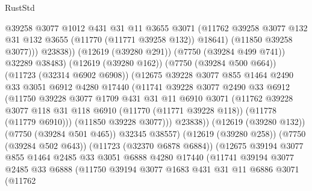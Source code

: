 \begin{lexlean}{RustStd}
\begin{coremodule}
                        @39258
                        @3077
                        @1012
                        @431
                        @31
                        @11
                        @3655
                        @3071
                        (@11762
                          @39258
                          @3077
                          @132
                          @31
                          @132
                          @3655
                          (@11770 (@11771 @39258 @132))
                          @18641)
                        (@11850 @39258 @3077)))
                    @23838))
                (@12619 (@39280 @291))
                (@7750 (@39284 @499 @741))
                @32289
                @38483)
              (@12619 (@39280 @162))
              (@7750 (@39284 @500 @664))
              (@11723 (@32314 @6902 @6908))
              (@12675
                @39228
                @3077
                @855
                @1464
                @2490
                @33
                @3051
                @6912
                @4280
                @17440
                (@11741
                  @39228
                  @3077
                  @2490
                  @33
                  @6912
                  (@11750
                    @39228
                    @3077
                    @1709
                    @431
                    @31
                    @11
                    @6910
                    @3071
                    (@11762
                      @39228
                      @3077
                      @118
                      @31
                      @118
                      @6910
                      (@11770 (@11771 @39228 @118))
                      (@11778 (@11779 @6910)))
                    (@11850 @39228 @3077)))
                @23838))
            (@12619 (@39280 @132))
            (@7750 (@39284 @501 @465))
            @32345
            @38557)
          (@12619 (@39280 @258))
          (@7750 (@39284 @502 @643))
          (@11723 (@32370 @6878 @6884))
          (@12675
            @39194
            @3077
            @855
            @1464
            @2485
            @33
            @3051
            @6888
            @4280
            @17440
            (@11741
              @39194
              @3077
              @2485
              @33
              @6888
              (@11750
                @39194
                @3077
                @1683
                @431
                @31
                @11
                @6886
                @3071
                (@11762

\end{coremodule}
\end{lexlean}
